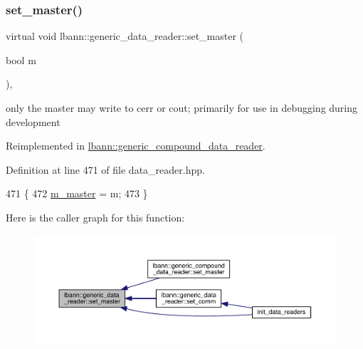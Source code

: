 \subsubsection{\texorpdfstring{set\+\_\+master()}{set\_master()}}
{\footnotesize\ttfamily virtual void lbann\+::generic\+\_\+data\+\_\+reader\+::set\+\_\+master (\begin{DoxyParamCaption}\item[{bool}]{m }\end{DoxyParamCaption})\hspace{0.3cm}{\ttfamily [inline]}, {\ttfamily [virtual]}}



only the master may write to cerr or cout; primarily for use in debugging during development 



Reimplemented in \hyperlink{classlbann_1_1generic__compound__data__reader_ae703ef84ca1c77221f4724a799f9ad0d}{lbann\+::generic\+\_\+compound\+\_\+data\+\_\+reader}.



Definition at line 471 of file data\+\_\+reader.\+hpp.


\begin{DoxyCode}
471                                   \{
472     \hyperlink{classlbann_1_1generic__data__reader_a52610681839ba81c3050c0881ffc005b}{m\_master} = m;
473   \}
\end{DoxyCode}
Here is the caller graph for this function\+:\nopagebreak
\begin{figure}[H]
\begin{center}
\leavevmode
\includegraphics[width=350pt]{classlbann_1_1generic__data__reader_a343f7d791a04aa1ef30ff829a899e2ae_icgraph}
\end{center}
\end{figure}
\mbox{\label{classlbann_1_1generic__data__reader_adf161cca4b80eb95f9748050e7fe1809}} 
